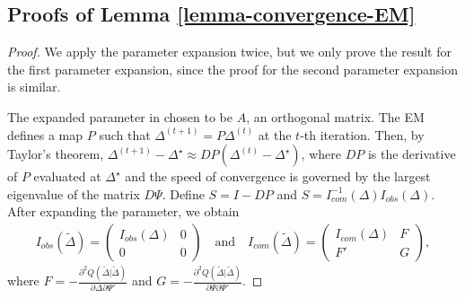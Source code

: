 \documentclass[pdftex, noinfoline, letter]{imsart}
\theoremstyle{plain}
\begin{document}
\subsection{Proofs of Lemma \ref{lemma-convergence-EM}}
\begin{proof}
We apply the parameter expansion twice, but we only prove the result for the first parameter expansion, since the proof for the second parameter expansion is similar. 

The expanded parameter in chosen to be $A$, an orthogonal matrix.
The EM defines a map $P$ such that $\Delta^{(t+1)} = P\Delta^{(t)}$ at the $t$-th iteration. Then, by Taylor's theorem, 
$\Delta^{(t+1)} - \Delta^\star \approx DP (\Delta^{(t)} - \Delta^\star)$, where $DP$ is the derivative of $P$ evaluated at $\Delta^\star$ and the speed of convergence is governed by the largest eigenvalue of the matrix $D\Psi$.
Define $S = I - DP$ and $S = I^{-1}_{com}(\Delta) I_{obs}(\Delta)$.
After expanding the parameter, we obtain 
\begin{align*}
I_{obs}(\widetilde \Delta)
=
\begin{pmatrix}
I_{obs}(\Delta) & 0\\
0 & 0
\end{pmatrix}
\quad \text{and}\quad
I_{com}(\widetilde \Delta) 
=
\begin{pmatrix}
I_{com}(\Delta) & F\\
F' & G
\end{pmatrix},
\end{align*}
where 
$F = -\frac{\partial^2 Q(\widetilde \Delta| \widetilde \Delta)}{\partial \Delta \partial \Psi'}$
and $G = -\frac{\partial^2 Q(\widetilde \Delta| \widetilde \Delta)}{\partial \Psi \partial \Psi'}$.


\end{proof}
\end{document}
